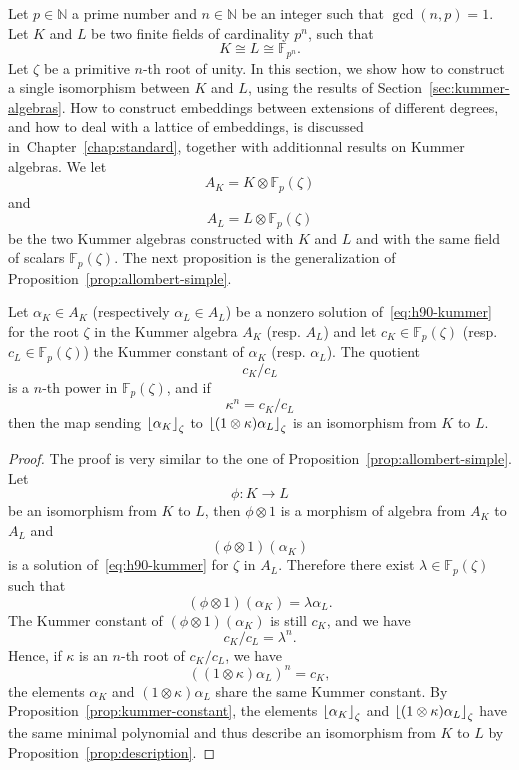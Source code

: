 Let $p\in\mathbb{N}$ a prime number and $n\in\mathbb{N}$ be an integer such that
$\gcd(n, p)=1$. Let $K$ and $L$ be two finite fields of cardinality $p^n$, such
that
\[
  K\cong L\cong \mathbb{F}_{p^n}.
\]
Let $\zeta$ be a primitive $n$-th root of unity. In this section, we show how to
construct a single isomorphism between $K$ and $L$, using the results of
Section~\ref{sec:kummer-algebras}. How to construct embeddings
between extensions of different degrees, and how to deal with a lattice of
embeddings, is discussed in~Chapter~\ref{chap:standard}, together with
additionnal results on Kummer algebras. We let
\[
  A_K = K\otimes\mathbb{F}_p(\zeta)
\]
and
\[
  A_L = L\otimes\mathbb{F}_{p}(\zeta)
\]
be the two Kummer algebras constructed with $K$ and $L$ and with the same field of
scalars $\mathbb{F}_{p}(\zeta)$. The next proposition is the generalization of
Proposition~\ref{prop:allombert-simple}.
\begin{prop}
 Let $\alpha_K\in A_K$ (respectively $\alpha_L\in A_L$) be a nonzero solution
 of~\eqref{eq:h90-kummer} for the root $\zeta$ in the Kummer algebra $A_K$
 (resp. $A_L$) and let $c_K\in\mathbb{F}_{p}(\zeta)$ (resp.
 $c_L\in\mathbb{F}_p(\zeta)$) the Kummer constant of $\alpha_K$
 (resp. $\alpha_L$). The quotient
 \[
   c_K/c_L
 \]
 is a $n$-th power in $\mathbb{F}_p(\zeta)$, and if
 \[
   \kappa^n = c_K/c_L
 \]
 then the map sending $\left\lfloor \alpha_K \right\rfloor_{\zeta}$ to
 $\left\lfloor (1\otimes\kappa)\alpha_L \right\rfloor_{\zeta}$ is an isomorphism from $K$ to $L$.
\end{prop}
\begin{proof}
  The proof is very similar to the one of
  Proposition~\ref{prop:allombert-simple}. Let
  \[
    \phi:K\to L
  \]
  be an isomorphism from $K$ to $L$, then $\phi\otimes1$ is a morphism of
  algebra from $A_K$ to $A_L$ and
  \[
    (\phi\otimes1)(\alpha_K)
  \]
  is a solution of~\eqref{eq:h90-kummer} for $\zeta$ in $A_L$. Therefore
  there exist $\lambda\in\mathbb{F}_p(\zeta)$ such that
  \[
    (\phi\otimes1)(\alpha_K) = \lambda\alpha_L.
  \]
  The Kummer constant of $(\phi\otimes1)(\alpha_K)$ is still $c_K$, and we have
  \[
    c_K/c_L = \lambda^n.
  \]
  Hence, if $\kappa$ is an $n$-th root of $c_K/c_L$, we have
  \[
    ((1\otimes\kappa)\alpha_L)^n = c_K,
  \]
  \ie the elements $\alpha_K$ and $(1\otimes\kappa)\alpha_L$ share the same
  Kummer constant. By Proposition~\ref{prop:kummer-constant}, the elements
  $\left\lfloor \alpha_K \right\rfloor_{\zeta}$ and $\left\lfloor (1\otimes\kappa)\alpha_L \right\rfloor_{\zeta}$ have
  the same minimal polynomial and thus describe an isomorphism from $K$ to $L$
  by Proposition~\ref{prop:description}.
\end{proof}

